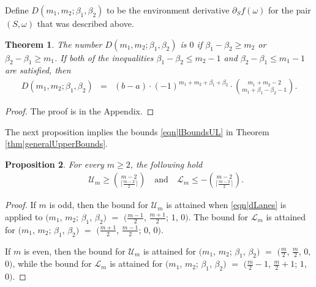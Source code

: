 \documentclass[reqno]{amsart}
\newtheorem{theorem}{Theorem}[section]
\newtheorem{proposition}[theorem]{Proposition}
\begin{document}
Define $D(m_1,m_2;\beta_1,\beta_2)$ to be the environment derivative $\partial_Sf(\omega)$ for the pair $(S,\omega)$ that was described above.

\begin{theorem}
\label{thm|dLanes} The number $D(m_1,m_2;\beta_1,\beta_2)$ is $0$ if $\beta_1-\beta_2\geq m_2$ or $\beta_2-\beta_1\geq m_1$. 
If both of the inequalities $\beta_1-\beta_2\leq m_2-1$ and $\beta_2-\beta_1\leq m_1-1$ are satisfied, then 
\begin{eqnarray}
D(m_1,m_2;\beta_1,\beta_2)&=& (b-a)\cdot (-1)^{m_1+m_2+\beta_1+\beta_2}\cdot\binom{m_1+m_2-2}{m_1+\beta_1-\beta_2-1}.
\label{eqn|dLanes}
\end{eqnarray}
\end{theorem}

\begin{proof} The proof is in the Appendix. \end{proof}
 

The next proposition implies the bounds \eqref{eqn|lBoundsUL} in Theorem \ref{thm|generalUpperBounds}.

 
 

\begin{proposition}\label{thm|badSets} For every $m\geq 2$, the following hold
\begin{eqnarray}&& \mathcal U_m\geq \binom{m-2}{\lceil\frac{m-2}2\rceil}\quad\mbox{and}\quad 
\mathcal L_m\leq -\binom{m-2}{\lceil\frac{m-2}2\rceil}. \label{eqn|ULBounds}
\end{eqnarray}
 \end{proposition}
\begin{proof}
If $m$ is odd, then the bound for $\mathcal U_m$ is attained when 
\eqref{eqn|dLanes} is applied to  $(m_1$, $m_2$; $\beta_1$, $\beta_2)$ $=$ $(\frac{m-1}2$, $\frac{m+1}2$; $1$, $0)$. The bound for $\mathcal L_m$ is attained for $(m_1$, $m_2$; $\beta_1$, $\beta_2)$ $=$ $(\frac{m+1}2$, $\frac{m-1}2$; $0$, $0)$.

If $m$ is even, then the bound for $\mathcal U_m$ is attained for $(m_1$, $m_2$; $\beta_1$, $\beta_2)$ $=$ $(\frac m2$, $\frac m2$, $0$, $0)$, while the bound for $\mathcal L_m$ is attained for $(m_1$, $m_2$; $\beta_1$, $\beta_2)$ $=$ $(\frac m2-1$, $\frac m2+1$; $1$, $0)$.
\end{proof}
 
 


   
 
 
 
\end{document}
